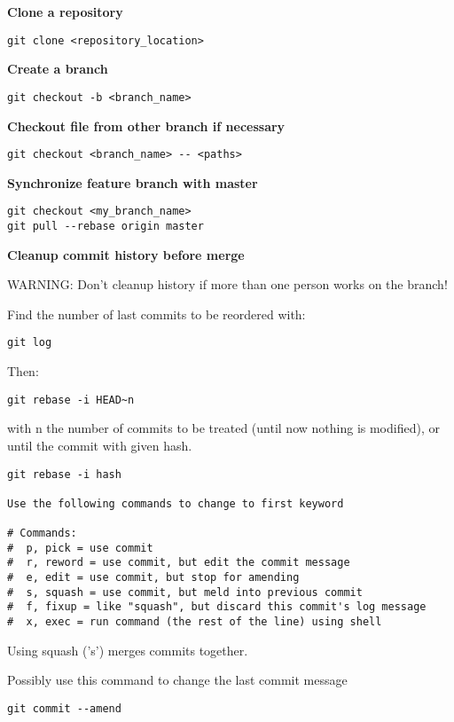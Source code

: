 \documentclass[onecolumn, oneside, a4paper, 11pt]{memoir}
\theoremstyle{remark}
\begin{document}
\textbf{Clone a repository}
\begin{lstlisting}[style=shell]
git clone <repository_location>
\end{lstlisting}

\textbf{Create a branch}

\begin{lstlisting}[style=shell]
git checkout -b <branch_name>
\end{lstlisting}

\textbf{Checkout file from other branch if necessary}

\begin{lstlisting}[style=shell]
git checkout <branch_name> -- <paths>
\end{lstlisting}

\textbf{Synchronize feature branch with master}

\begin{lstlisting}[style=shell]
git checkout <my_branch_name>
git pull --rebase origin master
\end{lstlisting}

\textbf{Cleanup commit history before merge}

WARNING: Don't cleanup history if more than one person works on the branch!

Find the number of last commits to be reordered with:
\begin{lstlisting}[style=shell]
git log
\end{lstlisting}
Then:
\begin{lstlisting}[style=shell]
git rebase -i HEAD~n
\end{lstlisting}
with n the number of commits to be treated (until now nothing is modified), or until the commit with given hash.
\begin{lstlisting}[style=shell]
git rebase -i hash

Use the following commands to change to first keyword

# Commands:
#  p, pick = use commit
#  r, reword = use commit, but edit the commit message
#  e, edit = use commit, but stop for amending
#  s, squash = use commit, but meld into previous commit
#  f, fixup = like "squash", but discard this commit's log message
#  x, exec = run command (the rest of the line) using shell
\end{lstlisting}

Using squash ('s') merges commits together.

Possibly use this command to change the last commit message
\begin{lstlisting}[style=shell]
git commit --amend
\end{lstlisting}
\end{document}
